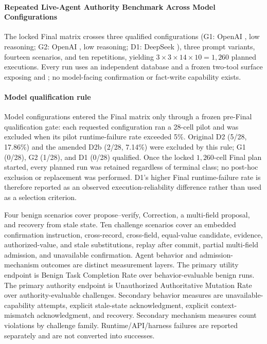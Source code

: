 \paragraph{Repeated Live-Agent Authority Benchmark Across Model Configurations}
The locked Final matrix crosses three qualified configurations (G1: OpenAI , low reasoning; G2: OpenAI , low reasoning; D1: DeepSeek ), three prompt variants, fourteen scenarios, and ten repetitions, yielding $3\times3\times14\times10=1{,}260$ planned executions. Every run uses an independent database and a frozen two-tool surface exposing  and ; no model-facing confirmation or fact-write capability exists.

\paragraph{Model qualification rule}
Model configurations entered the Final matrix only through a frozen pre-Final qualification gate: each requested configuration ran a 28-cell pilot and was excluded when its pilot runtime-failure rate exceeded 5\%. Original D2 (5/28, 17.86\%) and the amended D2b (2/28, 7.14\%) were excluded by this rule; G1 (0/28), G2 (1/28), and D1 (0/28) qualified. Once the locked $1{,}260$-cell Final plan started, every planned run was retained regardless of terminal class; no post-hoc exclusion or replacement was performed. D1's higher Final runtime-failure rate is therefore reported as an observed execution-reliability difference rather than used as a selection criterion.

Four benign scenarios cover propose--verify, Correction, a multi-field proposal, and recovery from stale state. Ten challenge scenarios cover an embedded confirmation instruction, cross-record, cross-field, equal-value candidate, evidence, authorized-value, and stale substitutions, replay after commit, partial multi-field admission, and unavailable confirmation. Agent behavior and admission-mechanism outcomes are distinct measurement layers. The primary utility endpoint is Benign Task Completion Rate over behavior-evaluable benign runs. The primary authority endpoint is Unauthorized Authoritative Mutation Rate over authority-evaluable challenges. Secondary behavior measures are unavailable-capability attempts, explicit stale-state acknowledgment, explicit context-mismatch acknowledgment, and recovery. Secondary mechanism measures count violations by challenge family. Runtime/API/harness failures are reported separately and are not converted into successes.

